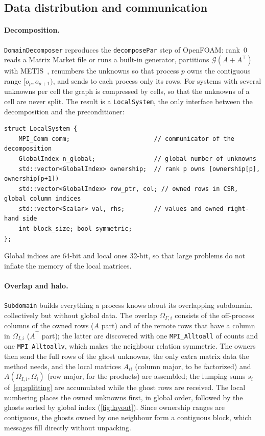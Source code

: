 \documentclass[11pt,a4paper]{article}
\begin{document}
\subsection{Data distribution and communication}\label{sec:distribution}

\paragraph{Decomposition.} \texttt{DomainDecomposer} reproduces the \texttt{decomposePar} step of OpenFOAM:
rank~0 reads a Matrix Market file or runs a built-in generator, partitions $\mathcal{G}(A+A^\top)$ with
METIS~\cite{Karypis1998}, renumbers the unknowns so that process $p$ owns the contiguous range
$[o_p,o_{p+1})$, and sends to each process only its rows. For systems with several unknowns per cell the
graph is compressed by cells, so that the unknowns of a cell are never split. The result is a
\texttt{LocalSystem}, the only interface between the decomposition and the preconditioner:
\begin{lstlisting}
struct LocalSystem {
    MPI_Comm comm;                       // communicator of the decomposition
    GlobalIndex n_global;                // global number of unknowns
    std::vector<GlobalIndex> ownership;  // rank p owns [ownership[p], ownership[p+1])
    std::vector<GlobalIndex> row_ptr, col; // owned rows in CSR, global column indices
    std::vector<Scalar> val, rhs;        // values and owned right-hand side
    int block_size; bool symmetric;
};
\end{lstlisting}
Global indices are 64-bit and local ones 32-bit, so that large problems do not inflate the memory of the
local matrices.

\paragraph{Overlap and halo.} \texttt{Subdomain} builds everything a process knows about its overlapping
subdomain, collectively but without global data. The overlap $\Omega_{\Gamma,i}$ consists of the
off-process columns of the owned rows ($A$ part) and of the remote rows that have a column in
$\Omega_{I,i}$ ($A^\top$ part); the latter are discovered with one \texttt{MPI\_Alltoall} of counts and one
\texttt{MPI\_Alltoallv}, which makes the neighbour relation symmetric. The owners then send the full rows of
the ghost unknowns, the only extra matrix data the method needs, and the local matrices $A_{ii}$ (column
major, to be factorized) and $A(\Omega_{I,i},\Omega_i)$ (row major, for the products) are assembled; the
lumping sums $s_i$ of~\eqref{eq:splitting} are accumulated while the ghost rows are received.
The local numbering places the owned unknowns first, in global order, followed by the ghosts sorted by
global index (\cref{fig:layout}). Since ownership ranges are contiguous, the ghosts owned by one neighbour
form a contiguous block, which messages fill directly without unpacking.
\end{document}

